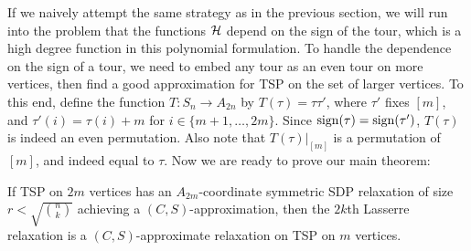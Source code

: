 If we naively attempt the same strategy as in the previous section, we will run into the problem that the functions $\mathcal H$ depend on the sign of the tour, which is a high degree function in this polynomial formulation. To handle the dependence on the sign of a tour, we need to embed any tour as an even tour on more vertices, then find a good approximation for \textsc{TSP} on the set of larger vertices. To this end, define the function $T: S_n \rightarrow A_{2n}$ by $T(\tau) = \tau \tau'$, where $\tau'$ fixes $[m]$, and $\tau'(i) = \tau(i)+m$ for $i \in \{m+1,\dots,2m\}$. Since $\operatorname{sign}(\tau) = \operatorname{sign}(\tau')$, $T(\tau)$ is indeed an even permutation. Also note that $T(\tau)|_{[m]}$ is a permutation of $[m]$, and indeed equal to $\tau$. Now we are ready to prove our main theorem:
\begin{theorem}\label{thm:tsp-opt}
If \textsc{TSP} on $2m$ vertices has an $A_{2m}$-coordinate symmetric SDP relaxation of size $r < \sqrt{\binom{n}{k}}$ achieving a $(C,S)$-approximation, then the $2k$th Lasserre relaxation is a $(C,S)$-approximate relaxation on \textsc{TSP} on $m$ vertices.
\end{theorem}
